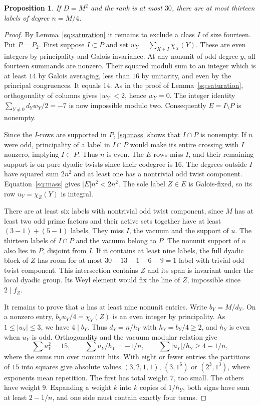 \documentclass[11pt]{amsart}
\numberwithin{equation}{section}
\newtheorem{proposition}[theorem]{Proposition}
\begin{document}
\begin{proposition}\label{sq:fourteen}
If $D=M^2$ and the rank is at most $30$, there are at most thirteen labels of degree $n=M/4$.
\end{proposition}
\begin{proof}
By Lemma~\ref{sq:saturation} it remains to exclude a class $I$ of size fourteen. Put $P=P_2$. First suppose $I\subset P$ and set $w_Y=\sum_{X\in I}\chi_X(Y)$. These are even integers by principality and Galois invariance. At any nonunit of odd degree $y$, all fourteen summands are nonzero. Their squared moduli sum to an integer which is at least $14$ by Galois averaging, less than $16$ by unitarity, and even by the principal congruences. It equals $14$. As in the proof of Lemma~\ref{sq:saturation}, orthogonality of columns gives $|w_Y|<2$, hence $w_Y=0$. The integer identity $\sum_{Y\ne0}d_Yw_Y/2=-7$ is now impossible modulo two. Consequently $E=I\setminus P$ is nonempty.

Since the $I$-rows are supported in $P$, \eqref{sq:mass} shows that $I\cap P$ is nonempty. If $n$ were odd, principality of a label in $I\cap P$ would make its entire crossing with $I$ nonzero, implying $I\subset P$. Thus $n$ is even. The $E$-rows miss $I$, and their remaining support is on pure dyadic twists since their codegree is $16$. The degrees outside $I$ have squared sum $2n^2$ and at least one has a nontrivial odd twist component. Equation~\eqref{sq:mass} gives $|E|n^2<2n^2$. The sole label $Z\in E$ is Galois-fixed, so its row $u_Y=\chi_Z(Y)$ is integral.

There are at least six labels with nontrivial odd twist component, since $M$ has at least two odd prime factors and their active sets together have at least $(3-1)+(5-1)$ labels. They miss $I$, the vacuum and the support of $u$. The thirteen labels of $I\cap P$ and the vacuum belong to $P$. The nonunit support of $u$ also lies in $P$, disjoint from $I$. If it contains at least nine labels, the full dyadic block of $Z$ has room for at most $30-13-1-6-9=1$ label with trivial odd twist component. This intersection contains $Z$ and its span is invariant under the local dyadic group. Its Weyl element would fix the line of $Z$, impossible since $2\mid f_Z$.

It remains to prove that $u$ has at least nine nonunit entries. Write $b_Y=M/d_Y$. On a nonzero entry, $b_Yu_Y/4=\chi_Y(Z)$ is an even integer by principality. As $1\le|u_Y|\le3$, we have $4\mid b_Y$. Thus $d_Y=n/h_Y$ with $h_Y=b_Y/4\ge2$, and $h_Y$ is even when $u_Y$ is odd. Orthogonality and the vacuum modular relation give
\[
 \sum u_Y^2=15,\qquad \sum u_Y/h_Y=-1/n,
 \qquad \sum |u_Y|/h_Y\ge4-1/n ,
\]
where the sums run over nonunit hits. With eight or fewer entries the partitions of $15$ into squares give absolute values $(3,2,1,1)$, $(3,1^6)$ or $(2^3,1^3)$, where exponents mean repetition. The first has total weight $7$, too small. The others have weight $9$. Expanding a weight $k$ into $k$ copies of $1/h_Y$, both signs have sum at least $2-1/n$, and one side must contain exactly four terms.


\end{proof}
\end{document}
